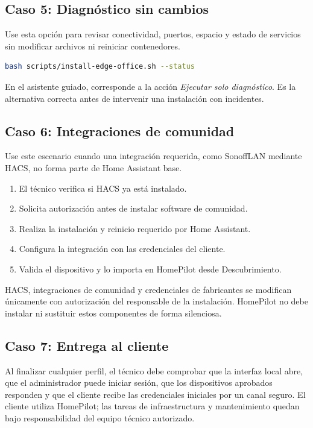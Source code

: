\subsection{Caso 5: Diagnóstico sin cambios}

Use esta opción para revisar conectividad, puertos, espacio y estado de servicios sin modificar archivos ni reiniciar contenedores.
\begin{lstlisting}[language=bash]
bash scripts/install-edge-office.sh --status
\end{lstlisting}

En el asistente guiado, corresponde a la acción \textit{Ejecutar solo diagnóstico}. Es la alternativa correcta antes de intervenir una instalación con incidentes.

\subsection{Caso 6: Integraciones de comunidad}

Use este escenario cuando una integración requerida, como SonoffLAN mediante HACS, no forma parte de Home Assistant base.
\begin{enumerate}[itemsep=0.15cm]
    \item El técnico verifica si HACS ya está instalado.
    \item Solicita autorización antes de instalar software de comunidad.
    \item Realiza la instalación y reinicio requerido por Home Assistant.
    \item Configura la integración con las credenciales del cliente.
    \item Valida el dispositivo y lo importa en HomePilot desde Descubrimiento.
\end{enumerate}

\begin{tcolorbox}[title=Regla de autorización]
HACS, integraciones de comunidad y credenciales de fabricantes se modifican únicamente con autorización del responsable de la instalación. HomePilot no debe instalar ni sustituir estos componentes de forma silenciosa.
\end{tcolorbox}

\subsection{Caso 7: Entrega al cliente}

Al finalizar cualquier perfil, el técnico debe comprobar que la interfaz local abre, que el administrador puede iniciar sesión, que los dispositivos aprobados responden y que el cliente recibe las credenciales iniciales por un canal seguro. El cliente utiliza HomePilot; las tareas de infraestructura y mantenimiento quedan bajo responsabilidad del equipo técnico autorizado.
